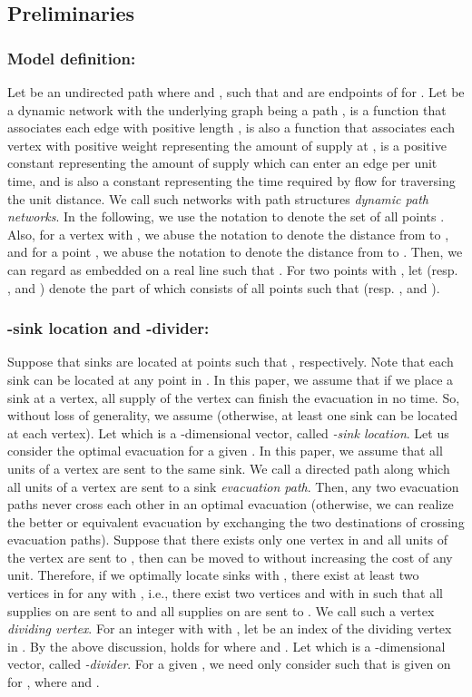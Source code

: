 \documentclass[a4paper]{llncs}
\begin{document}
\subsection{Preliminaries}
\label{sec:mmp}

\subsubsection{Model definition:}
Let  be an undirected path where   and ,  
such that  and  are endpoints of  for .
Let  be a dynamic network 
with the underlying graph being a path ,
 is a function that associates each edge  with positive length , 
 is also a function that associates each vertex  with positive weight  representing the amount of supply at ,
 is a positive constant representing the amount of supply which can enter an edge per unit time,
and  is also a constant representing the time required by flow for traversing the unit distance.
We call such networks with path structures {\it dynamic path networks}.
In the following, we use the notation  to denote the set of all points .
Also, for a vertex  with , we abuse the notation  to denote the distance from  to ,
and for a point , we abuse the notation  to denote the distance from  to .
Then, we can regard  as embedded on a real line such that .
For two points  with , 
let  (resp. ,  and ) denote the part of  which consists of all points  
such that  (resp. ,  and ).

\subsubsection{-sink location and -divider:}
Suppose that  sinks are located at points  such that , respectively.
Note that each sink can be located at any point in .
In this paper, we assume that if we place a sink at a vertex, all supply of the vertex can finish the evacuation in no time.
So, without loss of generality, we assume 
(otherwise, at least one sink can be located at each vertex). 
Let  which is a -dimensional vector, called {\it -sink location}.
Let us consider the optimal evacuation for a given .
In this paper, we assume that all units of a vertex are sent to the same sink.
We call a directed path along which all units of a vertex are sent to a sink {\it evacuation path}.
Then, any two evacuation paths never cross each other in an optimal evacuation
(otherwise, we can realize the better or equivalent evacuation by exchanging the two destinations of crossing evacuation paths).
Suppose that there exists only one vertex  in  and all units of the vertex are sent to ,
then  can be moved to  without increasing the cost of any unit.
Therefore, if we optimally locate  sinks with , there exist at least two vertices in  for any  with , i.e.,
there exist two vertices  and  with  in 
such that all supplies on  are sent to  and
all supplies on  are sent to .
We call such a vertex  {\it dividing vertex}.
For an integer  with  with , let  be an index of the dividing vertex in .
By the above discussion,  holds for  where  and .
Let  which is a -dimensional vector, called {\it -divider}.
For a given , we need only consider  such that  is given on  for , where  and .
\end{document}
